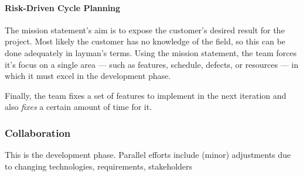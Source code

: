 \documentclass[main.tex]{subfiles}
\begin{document}
\paragraph{Risk-Driven Cycle Planning} The mission statement's aim is to expose the customer's desired result for the project. Most likely the customer has no knowledge of the field, so this can be done adequately in layman's terms. Using the mission statement, the team forces it's focus on a single area --- such as features, schedule, defects, or resources --- in which it must excel in the development phase.

Finally, the team fixes a set of features to implement in the next iteration and also \emph{fixes} a certain amount of time for it.

\subsubsection{Collaboration}

This is the development phase. Parallel efforts include (minor) adjustments due to changing technologies, requirements, stakeholders
\end{document}
